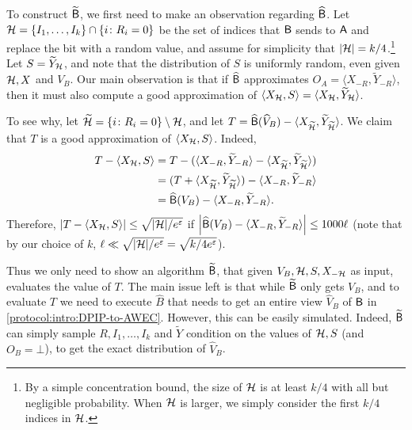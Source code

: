 To construct $\widetilde{\mathsf{B}}$, we first need to make an observation regarding  $\widehat{\mathsf{B}}$. 
Let $\cH=\set{I_1,\dots,I_k} \cap \set{i\colon R_i=0}$ be the set of indices that $\mathsf{B}$ sends to $\mathsf{A}$ and replace the bit with a random value, and assume for simplicity that $\size{\cH}=k/4$.\footnote{By a simple concentration bound, the size of ${\cal H}$ is at least $k/4$ with all but negligible probability. When ${\cal H}$ is larger, we simply consider the first $k/4$ indices in ${\cal H}$.} Let $S=\widetilde{Y}_{\cal H}$, and note that the distribution of $S$ is uniformly random, even given ${\cal H},X$ and $V_B$. Our main observation is that if $\widehat{\mathsf{B}}$  approximates $O_A=\langle X_{-R},\widetilde{Y}_{-R} \rangle$, then it must also compute a good approximation of $\langle X_{{\cal H}}, S \rangle =\langle X_{{\cal H}},  \widetilde{Y}_{{\cal H}}\rangle$.

To see why, let $\widetilde{\cH}=\set{i\colon R_i=0}\setminus \cH$, and let   $T=\widehat{\mathsf{B}} (\widehat{V}_B)-\langle X_{\widetilde{{\cal H}}},\widetilde{Y}_{\widetilde{{\cal H}}} \rangle$. We claim that $T$ is a good approximation of $\langle X_{{\cal H}}, S \rangle$. Indeed,
\begin{align*}
T-\langle X_{{\cal H}}, S \rangle &= T-(\langle X_{-R},  \widetilde{Y}_{-R}\rangle - \langle X_{\widetilde{{\cal H}}},  \widetilde{Y}_{\widetilde{{\cal H}}}\rangle)\\
&= (T + \langle X_{\widetilde{{\cal H}}},  \widetilde{Y}_{\widetilde{{\cal H}}}\rangle)-\langle X_{-R},  \widetilde{Y}_{-R}\rangle \\
& =\widehat{\mathsf{B}}(V_B) -\langle X_{-R},  \widetilde{Y}_{-R}\rangle. 
\end{align*}
Therefore, $\size{T-\langle X_{\cH}, S \rangle}\le \sqrt{\size{\cH}/e^\eps}$ if $\size{\widehat{\Bc}(V_B) -\langle X_{-R},  \widetilde{Y}_{-R}\rangle}\le 1000\ell$ (note that by our choice of $k$, $\ell \ll \sqrt{\size{\cH}/e^\eps}=\sqrt{k/4e^\eps}$).

Thus we only need to show an algorithm $\widetilde{\mathsf{B}}$, that given $V_B,{\cal H},S,X_{-{\cal H}}$ as input, evaluates the value of $T$. The main issue left is that while $\widetilde{\mathsf{B}}$ only gets $V_B$, and to evaluate $T$ we need to execute $\widehat{B}$ that needs to get an entire view $\widehat{V}_B$ of $\mathsf{B}$ in \cref{protocol:intro:DPIP-to-AWEC}. However, this can be easily simulated. Indeed, $\widetilde{\mathsf{B}}$ can simply sample $R,I_1,\dots,I_k$ and $\widetilde{Y}$ condition on the values of ${\cal H}, S$ (and $O_B=\bot$), to get the exact distribution of $\widehat{V}_B$.



